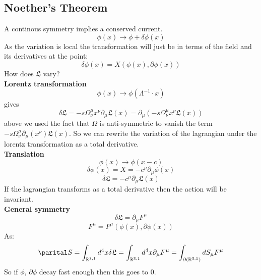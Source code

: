 \documentclass[12pt, a4paper, twoside, titlepage]{article}
\begin{document}
\subsection{Noether's Theorem}
A continous symmetry implies a conserved current.
$$
\phi(x) \rightarrow \phi + \delta \phi(x)
$$
As the variation is local the transformation will just be in terms of the field and its derivatives at the point:
$$
\delta \phi(x) = X(\phi(x), \partial\phi(x))
$$
How does $\mathfrak{L}$ vary?\\
\textbf{Lorentz transformation}
$$
\phi(x) \rightarrow \phi(\Lambda^{-1}\cdot x)
$$
gives
$$
\delta \mathfrak{L} =  -s \Omega^{\mu}_{\nu}x^{\nu}\partial_{\mu}\mathfrak{L}(x) =\partial_{\mu}( -s \Omega^{\mu}_{\nu}x^{\nu}\mathfrak{L}(x))  
$$
above we used the fact that $\Omega$ is anti-symmetric to vanish the term $-s \Omega^{\mu}_{\nu}\partial_{\mu}(x^{\nu})\mathfrak{L}(x)$. So we can rewrite the variation of the lagrangian under the lorentz transformation as a total derivative.\\
\textbf{Translation}
$$
\phi(x) \rightarrow \phi(x-c)
$$
$$
\delta \phi(x) = X = - c^{\mu}\partial_{\mu}\phi(x)
$$
$$
\delta \mathfrak{L} =  - c^{\mu}\partial_{\mu}\mathfrak{L}(x)
$$
If the lagrangian transforms as a total derivative then the action will be invariant.\\
\textbf{General symmetry}
\begin{equation}
        \delta \mathfrak{L} = \partial_{\mu} F^{\mu}
\end{equation}
$$
F^{\mu} = F^{\mu} (\phi(x), \partial\phi(x))
$$
As:
$$
\parital S = \int_{\mathbb{R}^{3,1}} d^4x \delta \mathfrak{L} = \int_{\mathbb{R}^{3,1}} d^4x \partial_{\mu} F^{\mu} =  \int_{\partial (\mathbb{R}^{3,1} )} dS_{\mu} F^{\mu}
                $$
So if $\phi$, $\partial \phi$ decay fast enough then this goes to 0.
\end{document}
